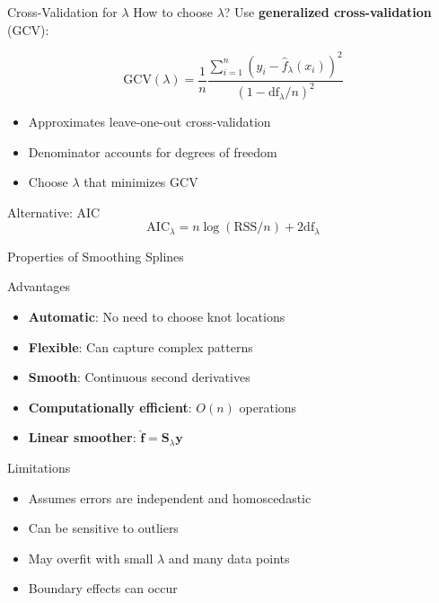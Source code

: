 \documentclass[aspectratio=169]{beamer}
\begin{document}
\begin{frame}{Cross-Validation for $\lambda$}
How to choose $\lambda$? Use \textbf{generalized cross-validation} (GCV):

\[
\text{GCV}(\lambda) = \frac{1}{n} \frac{\sum_{i=1}^{n} (y_i - \hat{f}_\lambda(x_i))^2}{(1 - \text{df}_\lambda/n)^2}
\]

\begin{itemize}
    \item Approximates leave-one-out cross-validation
    \item Denominator accounts for degrees of freedom
    \item Choose $\lambda$ that minimizes GCV
\end{itemize}

\begin{block}{Alternative: AIC}
\[
\text{AIC}_\lambda = n \log(\text{RSS}/n) + 2 \text{df}_\lambda
\]
\end{block}
\end{frame}

\begin{frame}{Properties of Smoothing Splines}
\begin{block}{Advantages}
\begin{itemize}
    \item \textbf{Automatic}: No need to choose knot locations
    \item \textbf{Flexible}: Can capture complex patterns
    \item \textbf{Smooth}: Continuous second derivatives
    \item \textbf{Computationally efficient}: $O(n)$ operations
    \item \textbf{Linear smoother}: $\hat{\mathbf{f}} = \mathbf{S}_\lambda \mathbf{y}$
\end{itemize}
\end{block}

\begin{block}{Limitations}
\begin{itemize}
    \item Assumes errors are independent and homoscedastic
    \item Can be sensitive to outliers
    \item May overfit with small $\lambda$ and many data points
    \item Boundary effects can occur
\end{itemize}
\end{block}
\end{frame}
\end{document}
